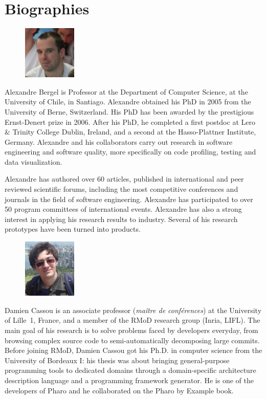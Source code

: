 \documentclass[a4paper,10pt,twoside]{book}
\begin{document}
	\sloppy
	\frontmatter
\fi
\chapter{Biographies}

\begin{figure}
\centering
\includegraphics[width=1in]{alexandre}
\end{figure}

Alexandre Bergel is Professor at the Department of Computer Science, at the University of Chile, in Santiago.
Alexandre obtained his PhD in 2005 from the University of Berne, Switzerland. His PhD has been awarded by the prestigious Ernst-Denert prize in 2006. After his PhD, he completed a first postdoc at Lero \& Trinity College Dublin, Ireland, and a second at the Hasso-Plattner Institute, Germany. Alexandre and his collaborators carry out research in software engineering and software quality, more specifically on code profiling, testing and data visualization.

Alexandre has authored over 60 articles, published in international and peer reviewed scientific forums, including the most competitive conferences and journals in the field of software engineering. Alexandre has participated to over 50 program committees of international events. Alexandre has also a strong interest in applying his research results to industry. Several of his research prototypes have been turned into products.


\begin{figure}
\centering
\includegraphics[width=1in]{damien}
\end{figure}
Damien Cassou is an associate professor (\textit{ma\^itre de
  conf\'erences}) at the University of Lille~1, France, and a member
of the RMoD research group (Inria, LIFL). The main goal of his
research is to solve problems faced by developers everyday, from
browsing complex source code to semi-automatically decomposing large
commits. Before joining RMoD, Damien Cassou got his Ph.D. in computer
science from the University of Bordeaux I: his thesis was about
bringing general-purpose programming tools to dedicated domains
through a domain-specific architecture description language and a
programming framework generator. He is one of the developers of Pharo
and he collaborated on the Pharo by Example book.
\end{document}
